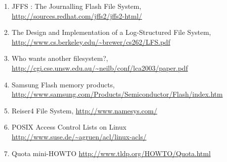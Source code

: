 \documentclass[12pt,a4paper,oneside,titlepage]{article}
\begin{document}
\begin{enumerate}

\item \raggedright \label{ref_JFFSdwmw2}
JFFS : The Journalling Flash File System,\\
\url{http://sources.redhat.com/jffs2/jffs2-html/}

\item \raggedright \label{ref_LFS}
The Design and Implementation of a Log-Structured File System,\\
\url{http://www.cs.berkeley.edu/~brewer/cs262/LFS.pdf}

\item \raggedright \label{ref_LaFS}
Who wants another filesystem?,\\
\url{http://cgi.cse.unsw.edu.au/~neilb/conf/lca2003/paper.pdf}

\item \raggedright \label{ref_SamsungNANDlist} 
Samsung Flash memory products,\\
\url{http://www.samsung.com/Products/Semiconductor/Flash/index.htm}

\item \raggedright \label{ref_Reiser4}
Reiser4 File System, \url{http://www.namesys.com/}

\item \raggedright \label{ref_ACL}
POSIX Access Control Lists on Linux
\url{http://www.suse.de/~agruen/acl/linux-acls/}

\item \raggedright \label{ref_Quota}
Quota mini-HOWTO
\url{http://www.tldp.org/HOWTO/Quota.html}

\end{enumerate}
\end{document}
